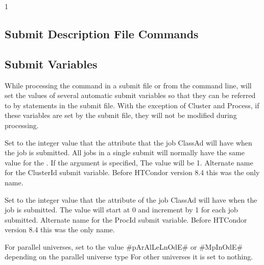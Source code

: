 \begin{ManPage}{\label{man-condor-submit}}{1}
\begin{Options}

\end{Options}

\subsection*{Submit Description File Commands}


\subsection*{Submit Variables}

While processing the  command in a submit file or from the command line,  will
set the values of several automatic submit variables so that they can be referred to by statements in the
submit file. With the exception of Cluster and Process, if these variables are set by the submit file, they will
not be modified during  processing.

\Item[ClusterId]
Set to the integer value that the  attribute that the job ClassAd will have when the job is submitted.
All jobs in a single submit will normally have the same value for the .
If the  argument is specified, The value will be 1.
\Item[Cluster]
Alternate name for the ClusterId submit variable.  Before HTCondor version 8.4 this was the only name.

\Item[ProcId]
Set to the integer value that the  attribute of the job ClassAd will have when the job is submitted.
The value will start at 0 and increment by 1 for each job submitted.
\Item[Process]
Alternate name for the ProcId submit variable.  Before HTCondor version 8.4 this was the only name.

\Item[Node]
For parallel universes, set to the value #pArAlLeLnOdE# or #MpInOdE# depending on the parallel universe type
For other universes it is set to nothing.


\end{ManPage}
